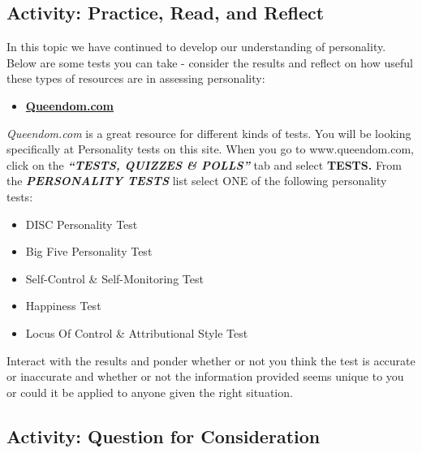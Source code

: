 \documentclass[
]{book}
\providecommand{\tightlist}{%
  \setlength{\itemsep}{0pt}\setlength{\parskip}{0pt}}
\begin{document}
\hypertarget{activity-practice-read-and-reflect}{%
\subsection*{Activity: Practice, Read, and Reflect}\label{activity-practice-read-and-reflect}}

\begin{reflect}
In this topic we have continued to develop our understanding of personality. Below are some tests you can take - consider the results and reflect on how useful these types of resources are in assessing personality:

\begin{itemize}
\tightlist
\item
  \href{https://www.queendom.com/}{\textbf{Queendom.com}}
\end{itemize}

\emph{Queendom.com} is a great resource for different kinds of tests. You will be looking specifically at Personality tests on this site. When you go to www.queendom.com, click on the \textbf{\emph{``TESTS, QUIZZES \& POLLS''}} tab and select \textbf{TESTS.} From the \textbf{\emph{PERSONALITY TESTS}} list select ONE of the following personality tests:

\begin{itemize}
\tightlist
\item
  DISC Personality Test\\
\item
  Big Five Personality Test\\
\item
  Self-Control \& Self-Monitoring Test\\
\item
  Happiness Test\\
\item
  Locus Of Control \& Attributional Style Test
\end{itemize}

Interact with the results and ponder whether or not you think the test is accurate or inaccurate and whether or not the information provided seems unique to you or could it be applied to anyone given the right situation.
\end{reflect}

\hypertarget{activity-question-for-consideration-4}{%
\subsection*{Activity: Question for Consideration}\label{activity-question-for-consideration-4}}
\end{document}
